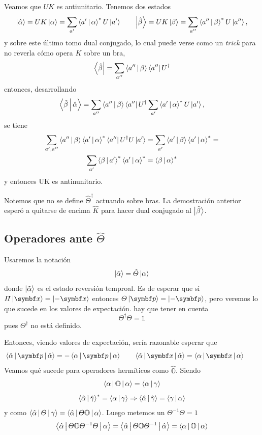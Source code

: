 \documentclass[10pt,oneside]{CBFT_book}
\begin{document}
Veamos que $UK$ es antiunitario. Tenemos dos estados 
\[
	\Ket{\hat{\alpha}} = UK \Ket{\alpha} = \sum_{a'} \Braket{a'|\alpha}^* U\Ket{a'} \qquad 
	\Ket{\hat{\beta}} = UK \Ket{\beta} = \sum_{a''} \Braket{a''|\beta}^* U\Ket{a''},
\]
y sobre este último tomo dual conjugado, lo cual puede verse como un {\it trick} para no reverla 
cómo opera $K$ sobre un bra,
\[
	\Bra{\hat{\beta}} = \sum_{a''} \Braket{a''|\beta} \Bra{a''}U^\dagger
\]
entonces, desarrollando
\[
	\Braket{\hat{\beta}|\hat{\alpha}} = \sum_{a''} \Braket{a''|\beta} \Bra{a''}U^\dagger
	\sum_{a'} \Braket{a'|\alpha}^* U\Ket{a'},
\]
se tiene
\begin{multline*}
	\sum_{a',a''} \Braket{a''|\beta} \Braket{a'|\alpha}^* \Bra{a''}U^\dagger U\Ket{a'} =
	\sum_{a'} \Braket{a'|\beta} \Braket{a'|\alpha}^* = \\
	\sum_{a'} \Braket{\beta|a'}^* \Braket{a'|\alpha}^* = \Braket{\beta|\alpha}^*
\end{multline*}
y entonces UK es antinunitario.

Notemos que no se define $\hat{\Theta}^\dagger$ actuando sobre bras. La demostración anterior esperó a 
quitarse de encima $\hat{K}$ para hacer dual conjugado al $\Ket{\tilde{\beta}}$.

\subsection{Operadores ante $\hat{\Theta}$}

Usaremos la notación 
\[
	\Ket{\tilde{\alpha}} = \hat{\Theta} \Ket{\alpha}
\]
donde $\Ket{\tilde{\alpha}}$ es el estado reversión temproal. Es de esperar que si $\Pi \Ket{\vb x} = 
\Ket{-\vb x}$ entonces $ \Theta \Ket{\vb p} = \Ket{-\vb p}$, pero veremos lo que sucede en los valores
de expectación.
hay que tener en cuenta 
\[
	\Theta^\dagger \Theta = \mathbb{1}
\]
pues $\Theta^\dagger$ no está definido.

Entonces, viendo valores de expectación, sería razonable esperar que 
\[
	\Braket{\hat{\alpha}|\vb{p}|\hat{\alpha}} = - \Braket{{\alpha}|\vb{p}|{\alpha}}\qquad 
	\Braket{\hat{\alpha}|\vb{x}|\hat{\alpha}} = \Braket{{\alpha}|\vb{x}|{\alpha}}\qquad 
\]
Veamos qué sucede para operadores hermíticos como $\hat{\mathbb{O}}$. Siendo
\[
	\Braket{\alpha|\mathbb{O}|\alpha} = \Braket{\alpha|\gamma}
\]
\[
	\Braket{\hat{\alpha}|\hat{\gamma}}^* = \Braket{\alpha|\gamma} \Rightarrow 
	\Braket{\hat{\alpha}|\hat{\gamma}} = \Braket{\gamma|\alpha}
\]
y como $\Braket{\hat{\alpha}|\Theta|\gamma} = \Braket{\hat{\alpha}|\Theta\mathbb{O}|\alpha}$.
Luego metemos un $\Theta^{-1}\Theta = 1$
\[
	\Braket{\hat{\alpha}|\Theta\mathbb{O}\Theta^{-1}\Theta|\alpha} =
	\Braket{\hat{\alpha}|\Theta\mathbb{O}\Theta^{-1}|\hat{\alpha}} = \Braket{\alpha|\mathbb{O}|\alpha}
\]
\end{document}
